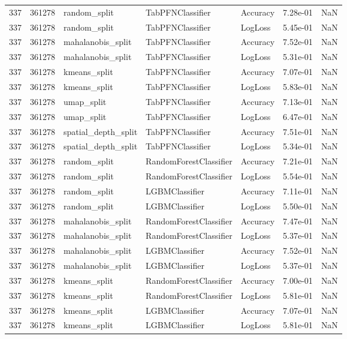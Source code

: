\begin{tabular}{rrlllrr}
337 & 361278 & random\_split & TabPFNClassifier & Accuracy & 7.28e-01 & NaN \\
337 & 361278 & random\_split & TabPFNClassifier & LogLoss & 5.45e-01 & NaN \\
337 & 361278 & mahalanobis\_split & TabPFNClassifier & Accuracy & 7.52e-01 & NaN \\
337 & 361278 & mahalanobis\_split & TabPFNClassifier & LogLoss & 5.31e-01 & NaN \\
337 & 361278 & kmeans\_split & TabPFNClassifier & Accuracy & 7.07e-01 & NaN \\
337 & 361278 & kmeans\_split & TabPFNClassifier & LogLoss & 5.83e-01 & NaN \\
337 & 361278 & umap\_split & TabPFNClassifier & Accuracy & 7.13e-01 & NaN \\
337 & 361278 & umap\_split & TabPFNClassifier & LogLoss & 6.47e-01 & NaN \\
337 & 361278 & spatial\_depth\_split & TabPFNClassifier & Accuracy & 7.51e-01 & NaN \\
337 & 361278 & spatial\_depth\_split & TabPFNClassifier & LogLoss & 5.34e-01 & NaN \\
337 & 361278 & random\_split & RandomForestClassifier & Accuracy & 7.21e-01 & NaN \\
337 & 361278 & random\_split & RandomForestClassifier & LogLoss & 5.54e-01 & NaN \\
337 & 361278 & random\_split & LGBMClassifier & Accuracy & 7.11e-01 & NaN \\
337 & 361278 & random\_split & LGBMClassifier & LogLoss & 5.50e-01 & NaN \\
337 & 361278 & mahalanobis\_split & RandomForestClassifier & Accuracy & 7.47e-01 & NaN \\
337 & 361278 & mahalanobis\_split & RandomForestClassifier & LogLoss & 5.37e-01 & NaN \\
337 & 361278 & mahalanobis\_split & LGBMClassifier & Accuracy & 7.52e-01 & NaN \\
337 & 361278 & mahalanobis\_split & LGBMClassifier & LogLoss & 5.37e-01 & NaN \\
337 & 361278 & kmeans\_split & RandomForestClassifier & Accuracy & 7.00e-01 & NaN \\
337 & 361278 & kmeans\_split & RandomForestClassifier & LogLoss & 5.81e-01 & NaN \\
337 & 361278 & kmeans\_split & LGBMClassifier & Accuracy & 7.07e-01 & NaN \\
337 & 361278 & kmeans\_split & LGBMClassifier & LogLoss & 5.81e-01 & NaN \\

\end{tabular}
